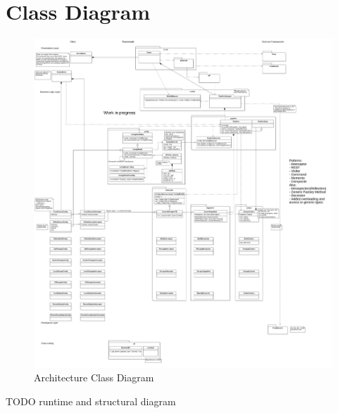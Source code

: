   \section{Class Diagram}
    \begin{figure}[H]
        \includegraphics[width = 1.2\linewidth]{diagrams/architecture_classes.png}
        \caption{Architecture Class Diagram}
        \label{fig:architecture_classes}
      \end{figure}

TODO runtime and structural diagram
